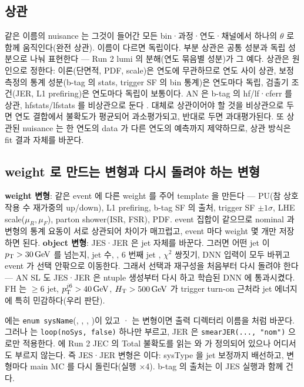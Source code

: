 \subsection{상관}\label{sec:syst-corr}

같은 이름의 nuisance 는 그것이 들어간 모든 bin·과정·연도·채널에서 하나의 $\theta$ 로 함께 움직인다(완전 상관). 이름이 다르면 독립이다.
부분 상관은 공통 성분과 독립 성분으로 나눠 표현한다 — Run 2 lumi 의 분해(연도 묶음별 성분)가 그 예다. 상관은 원인으로
정한다: 이론(단면적, PDF, scale)은 연도에 무관하므로 연도 사이 상관, 보정 측정의 통계 성분(b-tag 의 stats, trigger SF 의 bin 통계)은 연도마다
독립, 검출기 조건(JER, L1 prefiring)은 연도마다 독립이 보통이다. AN 은 b-tag 의 hf/lf·cferr 를 상관, hfstats/lfstats 를 비상관으로 둔다
. 대체로 상관이어야 할 것을 비상관으로 두면 연도 결합에서 불확도가 평균되어 과소평가되고, 반대로 두면
과대평가된다. 또 상관된 nuisance 는 한 연도의 data 가 다른 연도의 예측까지 제약하므로, 상관 방식은 fit 결과 자체를 바꾼다.

\subsection{weight 로 만드는 변형과 다시 돌려야 하는 변형}\label{sec:syst-weight-vs-rerun}

\textbf{weight 변형}: 같은 event 에 다른 weight 를 주어 template 을 만든다 — PU(참 상호작용 수 재가중의 up/down), L1 prefiring, b-tag SF 의 출처,
trigger SF $\pm1\sigma$, LHE scale($\mu_R,\mu_F$), parton shower(ISR, FSR), PDF. event 집합이 같으므로 nominal 과 변형의 통계 요동이 서로 상관되어
차이가 매끄럽고, event 마다 weight 몇 개만 저장하면 된다. \textbf{object 변형}: JES·JER 은 jet \pt 자체를 바꾼다. 그러면 어떤 jet 이 $p_{\mathrm{T}}>30\,\mathrm{GeV}$ 를
넘는지, jet 수, \HT, 6 번째 jet \pt, $\chi^2$ 쌍짓기, DNN 입력이 모두 바뀌고 event 가 선택 안팎으로 이동한다. 그래서 선택과 재구성을 처음부터 다시
돌려야 한다 — AN SL 도 JES·JER 은 ntuple 생성부터 다시 하고 학습된 DNN 에 통과시켰다. FH 는 $\ge6$ jet,
$p_{\mathrm{T}}^{j6}>40\,\mathrm{GeV}$, $H_{\mathrm{T}}>500\,\mathrm{GeV}$ 가 trigger turn-on 근처라 jet 에너지에 특히 민감하다(우리 판단).

\begin{impl}
 에는 \texttt{enum sysName}(, , , )이 있고 · 는 변형이면 출력
디렉터리 이름을  처럼 바꾼다. 그러나  는 \texttt{loop(noSys, false)} 하나만 부르고, JER 은
\texttt{smearJER(..., "nom")} 으로만 적용한다.  에 Run 2 JEC 의 Total 불확도를 읽는  와
 가 정의되어 있으나 어디서도 부르지 않는다. 즉 JES·JER 변형은 \tagplan 이다: sysType 을 jet 보정까지 배선하고, 변형마다
main MC 를 다시 돌린다(실행 ×4). b-tag 의  출처는 이 JES 실행과 함께 건다.
\end{impl}

